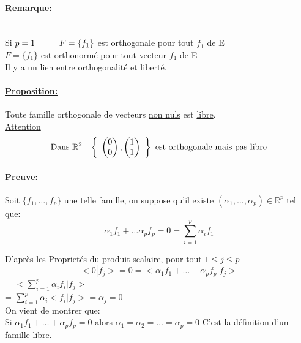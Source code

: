 \documentclass{article}
\newcommand\tab[1][1cm]{\hspace*{#1}}
\begin{document}
\paragraph{\underline{Remarque:}} \mbox{}\\
Si $p = 1 \tab F = \{f_1\}$ est orthogonale pour tout $f_1$ de E \\
\tab[2.1cm] $F = \{f_1\}$ est orthonormé pour tout vecteur $f_1$ de E \\

Il y a un lien entre orthogonalité et liberté.

\paragraph{\underline{Proposition:}} Toute famille orthogonale de vecteurs \underline{non nuls} est \underline{libre}. \\
\underline{Attention}
$$
\mbox{Dans } \mathbb{R}^2 \tab[0.3cm]
\left\{
    \begin{array}{ll}
        \begin{pmatrix}
            0\\
            0\\
        \end{pmatrix},
        \begin{pmatrix}
            1\\
            1\\
        \end{pmatrix}
    \end{array}
\right\} \mbox{ est orthogonale mais pas libre}
$$

\paragraph{\underline{Preuve:}} Soit $\{f_1, \dots, f_p\}$ une telle famille, on suppose qu'il existe $(\alpha_1, \dots, \alpha_p) \in \mathbb{R}^p$ tel que:
$$
\alpha_1 f_1 + \dots \alpha_p f_p = 0 = \sum_{i = 1}^p \alpha_i f_1
$$

D'après les Proprietés du produit scalaire, \underline{pour tout} $1 \leq j \leq p$
$$
<0 | f_j> = 0 = <\alpha_1 f_1 + \dots + \alpha_p f_p | f_j>
$$
\tab[6.5cm]= $<\sum_{i = 1}^p \alpha_i f_i | f_j>$ \\
\tab[6.5cm]= $\sum_{i = 1}^p \alpha_i <f_i | f_j> = \alpha_j = 0$ \\
On vient de montrer que: \\
Si $\alpha_1 f_1 + \dots + \alpha_p f_p = 0$ alors $\alpha_1 = \alpha_2 = \dots = \alpha_p = 0$
C'est la définition d'un famille libre.
\end{document}
